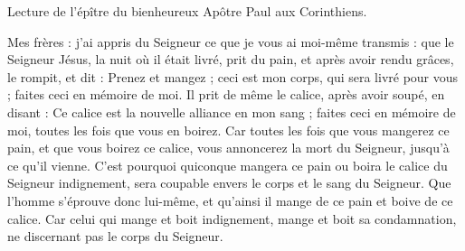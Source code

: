 Lecture de l'épître du bienheureux Apôtre Paul aux Corinthiens.

Mes frères : j’ai appris du Seigneur ce que je vous ai moi-même transmis : que le Seigneur Jésus, la nuit où il était livré, prit du pain, et après avoir rendu grâces, le rompit, et dit : Prenez et mangez ; ceci est mon corps, qui sera livré pour vous ; faites ceci en mémoire de moi. Il prit de même le calice, après avoir soupé, en disant : Ce calice est la nouvelle alliance en mon sang ; faites ceci en mémoire de moi, toutes les fois que vous en boirez. Car toutes les fois que vous mangerez ce pain, et que vous boirez ce calice, vous annoncerez la mort du Seigneur, jusqu’à ce qu’il vienne. C’est pourquoi quiconque mangera ce pain ou boira le calice du Seigneur indignement, sera coupable envers le corps et le sang du Seigneur. Que l’homme s’éprouve donc lui-même, et qu’ainsi il mange de ce pain et boive de ce calice. Car celui qui mange et boit indignement, mange et boit sa condamnation, ne discernant pas le corps du Seigneur.
